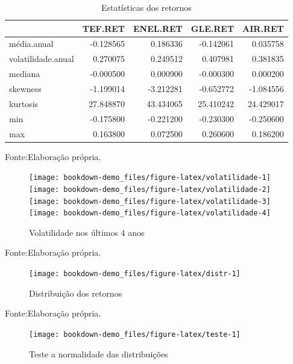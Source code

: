 \documentclass[
  12pt,
  a4paper,
  openany]{book}
\begin{document}
\begin{table}[!h]

\caption{\label{tab:unnamed-chunk-12}Estatísticas dos retornos}
\centering
\begin{tabular}[t]{lrrrr}
\toprule
  & TEF.RET & ENEL.RET & GLE.RET & AIR.RET\\
\midrule
média.anual & -0.128565 & 0.186336 & -0.142061 & 0.035758\\
volatilidade.anual & 0.270075 & 0.249512 & 0.407981 & 0.381835\\
mediana & -0.000500 & 0.000900 & -0.000300 & 0.000200\\
skewness & -1.199014 & -3.212281 & -0.652772 & -1.084556\\
kurtosis & 27.848870 & 43.434065 & 25.410242 & 24.429017\\
\addlinespace
min & -0.175800 & -0.221200 & -0.230300 & -0.250600\\
max & 0.163800 & 0.072500 & 0.260600 & 0.186200\\
\bottomrule
\end{tabular}
\end{table}
\FloatBarrier
\centering

Fonte:Elaboração própria.

\justifying
\bigskip
\begin{figure}

{\centering \texttt{[image: bookdown-demo\_files/figure-latex/volatilidade-1]} \texttt{[image: bookdown-demo\_files/figure-latex/volatilidade-2]} \texttt{[image: bookdown-demo\_files/figure-latex/volatilidade-3]} \texttt{[image: bookdown-demo\_files/figure-latex/volatilidade-4]} 

}

\caption{Volatilidade nos últimos 4 anos}\label{fig:volatilidade}
\end{figure}
\FloatBarrier
\centering

Fonte:Elaboração própria.

\justifying
\bigskip
\begin{figure}

{\centering \texttt{[image: bookdown-demo\_files/figure-latex/distr-1]} 

}

\caption{Distribuição dos retornos}\label{fig:distr}
\end{figure}
\FloatBarrier
\centering

Fonte:Elaboração própria.

\justifying
\bigskip
\begin{figure}

{\centering \texttt{[image: bookdown-demo\_files/figure-latex/teste-1]} 

}

\caption{Teste a normalidade das distribuições}\label{fig:teste}
\end{figure}
\FloatBarrier
\centering
\end{document}
